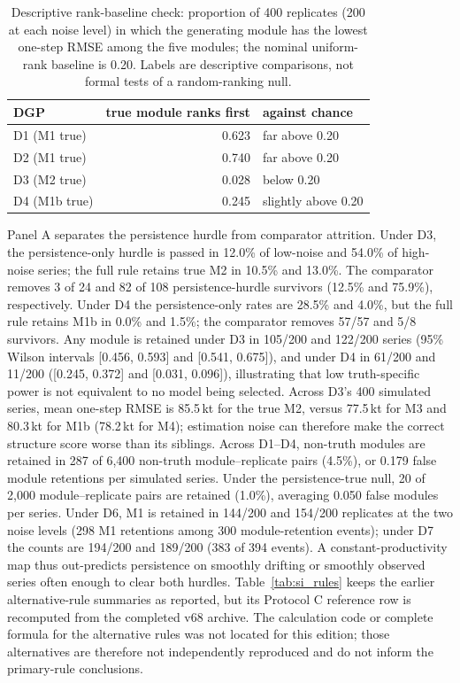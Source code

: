 \begin{table}[!htb]
\centering\small
\caption{Descriptive rank-baseline check: proportion of 400 replicates (200 at each noise level) in which the generating module has the lowest one-step RMSE among the five modules; the nominal uniform-rank baseline is 0.20. Labels are descriptive comparisons, not formal tests of a random-ranking null.}
\label{tab:si_chance}
\begin{tabular}{@{}lrl@{}}
\toprule
DGP & true module ranks first & against chance \\
\midrule
D1 (M1 true) & 0.623 & far above 0.20 \\
D2 (M1 true) & 0.740 & far above 0.20 \\
D3 (M2 true) & 0.028 & below 0.20 \\
D4 (M1b true) & 0.245 & slightly above 0.20 \\
\bottomrule
\end{tabular}
\end{table}

Panel A separates the persistence hurdle from comparator attrition. Under D3, the persistence-only hurdle is passed in 12.0\% of low-noise and 54.0\% of high-noise series; the full rule retains true M2 in 10.5\% and 13.0\%. The comparator removes 3 of 24 and 82 of 108 persistence-hurdle survivors (12.5\% and 75.9\%), respectively. Under D4 the persistence-only rates are 28.5\% and 4.0\%, but the full rule retains M1b in 0.0\% and 1.5\%; the comparator removes 57/57 and 5/8 survivors. Any module is retained under D3 in 105/200 and 122/200 series (95\% Wilson intervals [0.456, 0.593] and [0.541, 0.675]), and under D4 in 61/200 and 11/200 ([0.245, 0.372] and [0.031, 0.096]), illustrating that low truth-specific power is not equivalent to no model being selected. Across D3's 400 simulated series, mean one-step RMSE is 85.5\,kt for the true M2, versus 77.5\,kt for M3 and 80.3\,kt for M1b (78.2\,kt for M4); estimation noise can therefore make the correct structure score worse than its siblings. Across D1--D4, non-truth modules are retained in 287 of 6,400 non-truth module--replicate pairs (4.5\%), or 0.179 false module retentions per simulated series. Under the persistence-true null, 20 of 2,000 module--replicate pairs are retained (1.0\%), averaging 0.050 false modules per series. Under D6, M1 is retained in 144/200 and 154/200 replicates at the two noise levels (298 M1 retentions among 300 module-retention events); under D7 the counts are 194/200 and 189/200 (383 of 394 events). A constant-productivity map thus out-predicts persistence on smoothly drifting or smoothly observed series often enough to clear both hurdles. Table~\ref{tab:si_rules} keeps the earlier alternative-rule summaries as reported, but its Protocol C reference row is recomputed from the completed v68 archive. The calculation code or complete formula for the alternative rules was not located for this edition; those alternatives are therefore not independently reproduced and do not inform the primary-rule conclusions.

